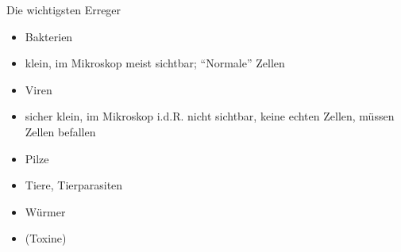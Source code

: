 \documentclass{article}
\begin{document}
{\mdseries\color[rgb]{0.0,0.0,0.5019608}
Die wichtigsten Erreger}

\begin{itemize}
\item {\mdseries
Bakterien}

\end{itemize}
\begin{itemize}
\item {\mdseries
klein, im Mikroskop meist sichtbar;
{\textquotedblleft}Normale{\textquotedblright} Zellen}

\end{itemize}
\begin{itemize}
\item {\mdseries
Viren}

\end{itemize}
\begin{itemize}
\item {\mdseries
sicher klein, im Mikroskop i.d.R. nicht sichtbar, keine echten Zellen,
m\"ussen Zellen befallen}

\end{itemize}
\begin{itemize}
\item {\mdseries
Pilze}

\item {\mdseries
Tiere, Tierparasiten}

\end{itemize}
\begin{itemize}
\item {\mdseries
W\"urmer}

\end{itemize}
\begin{itemize}
\item {\mdseries
(Toxine)}

\end{itemize}
\end{document}
